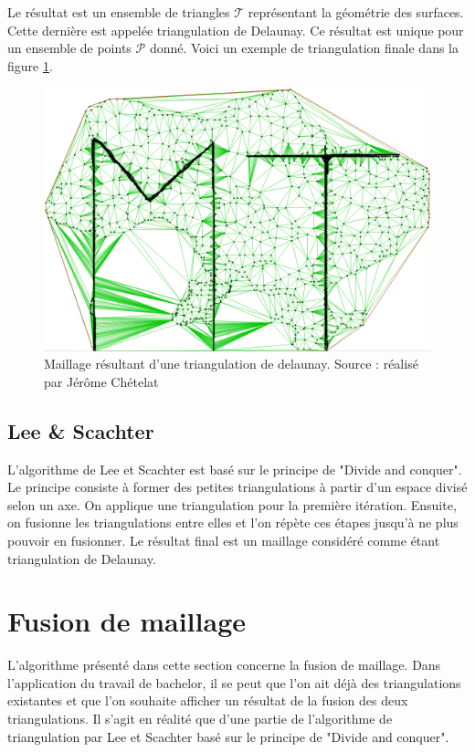 Le résultat est un ensemble de triangles $\mathcal{T}$ représentant la géométrie
des surfaces. Cette dernière est appelée triangulation de Delaunay.
Ce résultat est unique pour un ensemble de points $\mathcal{P}$ donné.
Voici un exemple de triangulation finale dans la figure \ref{fig:example_delaunay}.

\begin{figure}[htbp!]
    \centering
    \includegraphics[width=0.8\linewidth]{figures/example_delaunay.png}
    \caption{Maillage résultant d'une triangulation de delaunay. Source : réalisé par Jérôme Chételat}
    \label{fig:example_delaunay}
\end{figure}

\subsection{Lee \& Scachter}

L'algorithme de Lee et Scachter est basé sur le principe de "Divide and conquer".
Le principe consiste à former des petites triangulations à partir d'un espace divisé selon un axe. On applique une triangulation pour la première itération. Ensuite, on fusionne les triangulations entre elles et l'on répète ces étapes jusqu'à ne plus pouvoir en fusionner. Le résultat final est un maillage considéré comme étant triangulation de Delaunay. 

\section{Fusion de maillage}

L'algorithme présenté dans cette section concerne la fusion de maillage. Dans l'application du travail de bachelor, il se peut que l'on ait déjà des triangulations existantes et que l'on souhaite afficher un résultat de la fusion des deux triangulations. Il s'agit en réalité que d'une partie de l'algorithme de triangulation par Lee et Scachter basé sur le principe de "Divide and conquer".


